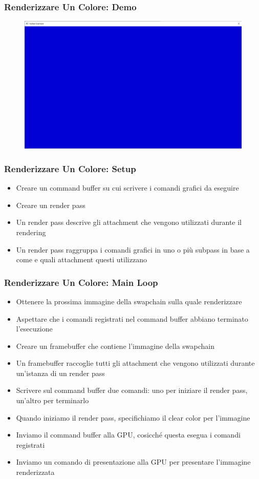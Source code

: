 \begin{frame}
\frametitle{Renderizzare Un Colore: Demo}
\begin{figure}[ht]
    \centering
    \includegraphics[scale=0.25]{images/SlidesClearWindow/ClearWindow.png}
\end{figure}
\end{frame}

\begin{frame}
\frametitle{Renderizzare Un Colore: Setup}

\begin{itemize}
    \item Creare un command buffer su cui scrivere i comandi grafici da eseguire
    \item Creare un render pass
    \item Un render pass descrive gli attachment che vengono utilizzati durante il rendering
    \item Un render pass raggruppa i comandi grafici in uno o più subpass in base a come e quali attachment questi utilizzano
\end{itemize}
\end{frame}

\begin{frame}
\frametitle{Renderizzare Un Colore: Main Loop}

\begin{itemize}
    \item Ottenere la prossima immagine della swapchain sulla quale renderizzare
    \item Aspettare che i comandi registrati nel command buffer abbiano terminato l'esecuzione
    \item Creare un framebuffer che contiene l'immagine della swapchain
    \item Un framebuffer raccoglie tutti gli attachment che vengono utilizzati durante un'istanza di un render pass
    \item Scrivere sul command buffer due comandi: uno per iniziare il render pass, un'altro per terminarlo
    \item Quando iniziamo il render pass, specifichiamo il clear color per l'immagine
    \item Inviamo il command buffer alla GPU, cosicché questa esegua i comandi registrati
    \item Inviamo un comando di presentazione alla GPU per presentare l'immagine renderizzata
\end{itemize}

\end{frame}
